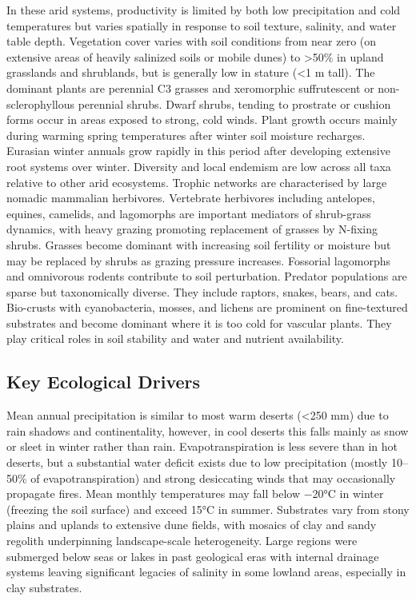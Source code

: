 \documentclass[
  letterpaper,
  DIV=11,
  numbers=noendperiod]{scrartcl}
\begin{document}
In these arid systems, productivity is limited by both low precipitation
and cold temperatures but varies spatially in response to soil texture,
salinity, and water table depth. Vegetation cover varies with soil
conditions from near zero (on extensive areas of heavily salinized soils
or mobile dunes) to \textgreater50\% in upland grasslands and
shrublands, but is generally low in stature (\textless1 m tall). The
dominant plants are perennial C3 grasses and xeromorphic suffrutescent
or non-sclerophyllous perennial shrubs. Dwarf shrubs, tending to
prostrate or cushion forms occur in areas exposed to strong, cold winds.
Plant growth occurs mainly during warming spring temperatures after
winter soil moisture recharges. Eurasian winter annuals grow rapidly in
this period after developing extensive root systems over winter.
Diversity and local endemism are low across all taxa relative to other
arid ecosystems. Trophic networks are characterised by large nomadic
mammalian herbivores. Vertebrate herbivores including antelopes,
equines, camelids, and lagomorphs are important mediators of shrub-grass
dynamics, with heavy grazing promoting replacement of grasses by
N-fixing shrubs. Grasses become dominant with increasing soil fertility
or moisture but may be replaced by shrubs as grazing pressure increases.
Fossorial lagomorphs and omnivorous rodents contribute to soil
perturbation. Predator populations are sparse but taxonomically diverse.
They include raptors, snakes, bears, and cats. Bio-crusts with
cyanobacteria, mosses, and lichens are prominent on fine-textured
substrates and become dominant where it is too cold for vascular plants.
They play critical roles in soil stability and water and nutrient
availability.

\subsection{Key Ecological Drivers}\label{key-ecological-drivers-91}

Mean annual precipitation is similar to most warm deserts (\textless250
mm) due to rain shadows and continentality, however, in cool deserts
this falls mainly as snow or sleet in winter rather than rain.
Evapotranspiration is less severe than in hot deserts, but a substantial
water deficit exists due to low precipitation (mostly 10--50\% of
evapotranspiration) and strong desiccating winds that may occasionally
propagate fires. Mean monthly temperatures may fall below −20°C in
winter (freezing the soil surface) and exceed 15°C in summer. Substrates
vary from stony plains and uplands to extensive dune fields, with
mosaics of clay and sandy regolith underpinning landscape-scale
heterogeneity. Large regions were submerged below seas or lakes in past
geological eras with internal drainage systems leaving significant
legacies of salinity in some lowland areas, especially in clay
substrates.
\end{document}
